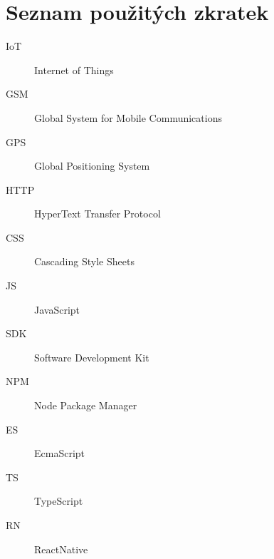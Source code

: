 \chapter*{Seznam použitých zkratek}

\begin{multicols}{2}
\raggedright
\begin{description}
\item [IoT] Internet of Things
\item [GSM] Global System for Mobile Communications
\item [GPS] Global Positioning System
\item [HTTP] HyperText Transfer Protocol
\item[CSS] Cascading Style Sheets
\item [JS] JavaScript
\item [SDK] Software Development Kit
\item [NPM] Node Package Manager
\item [ES] EcmaScript
\item [TS] TypeScript
\item [RN] ReactNative
\end{description}
\end{multicols}

